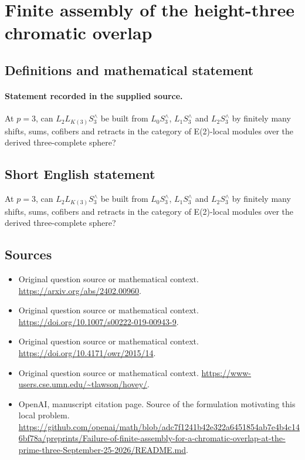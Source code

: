 \documentclass[11pt]{article}
\begin{document}
\section*{Finite assembly of the height-three chromatic overlap}\label{30007504}
\subsection{Definitions and mathematical statement}
\paragraph{Statement recorded in the supplied source.}
At $p=3$, can $L_{2}L_{K(3)}S_{3}^\wedge $ be built from $L_{0}S_{3}^\wedge $, $L_{1}S_{3}^\wedge $ and $L_{2}S_{3}^\wedge $ by finitely many shifts, sums, cofibers and retracts in the category of E(2)-local modules over the derived three-complete sphere?
\subsection{Short English statement}
At $p=3$, can $L_{2}L_{K(3)}S_{3}^\wedge $ be built from $L_{0}S_{3}^\wedge $, $L_{1}S_{3}^\wedge $ and $L_{2}S_{3}^\wedge $ by finitely many shifts, sums, cofibers and retracts in the category of E(2)-local modules over the derived three-complete sphere?
\subsection{Sources}
\begin{itemize}
\item[S1] Original question source or mathematical context.
\url{https://arxiv.org/abs/2402.00960}.
\item[S2] Original question source or mathematical context.
\url{https://doi.org/10.1007/s00222-019-00943-9}.
\item[S3] Original question source or mathematical context.
\url{https://doi.org/10.4171/owr/2015/14}.
\item[S4] Original question source or mathematical context.
\url{https://www-users.cse.umn.edu/~tlawson/hovey/}.
\item[S5] OpenAI, manuscript citation page. Source of the formulation motivating this local problem.
\url{https://github.com/openai/math/blob/adc7f1241b42e322a6451854ab7e4b4c146bf78a/preprints/Failure-of-finite-assembly-for-a-chromatic-overlap-at-the-prime-three-September-25-2026/README.md}.
\end{itemize}
\end{document}
